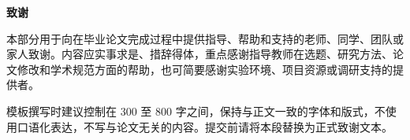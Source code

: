 {}
\begin{center}
  {\heiti{}\bfseries 致\qquad 谢}
\end{center}

\vspace{1.5\baselineskip}

{\songti{}
本部分用于向在毕业论文完成过程中提供指导、帮助和支持的老师、同学、团队或家人致谢。内容应实事求是、措辞得体，重点感谢指导教师在选题、研究方法、论文修改和学术规范方面的帮助，也可简要感谢实验环境、项目资源或调研支持的提供者。

模板撰写时建议控制在 300 至 800 字之间，保持与正文一致的字体和版式，不使用口语化表达，不写与论文无关的内容。提交前请将本段替换为正式致谢文本。
}
